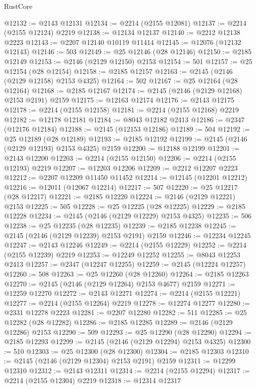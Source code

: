 \begin{lexlean}{RustCore}
\begin{coremodule}
@12132 := @2143 @12131
@12134 := @2214 (@2155 @12081)
@12137 := @2214 (@2155 @12124) @2219
@12138 := @12134 @12137
@12140 := @2212 @12138 @2223
@12143 := @2207 @12140 @10119 @11414
@12145 := @12076 (@12132 @12143)
@12146 := 503
@12149 := @25 @12146 (@28 @12146)
@12150 := @2185 @12149
@12153 := @2146 (@2129 @12150) @2153
@12154 := 501
@12157 := @25 @12154 (@28 @12154)
@12158 := @2185 @12157
@12163 := @2145 (@2146 (@2129 @12158) @2153 @4325)
@12164 := 502
@12167 := @25 @12164 (@28 @12164)
@12168 := @2185 @12167
@12174 := @2145 (@2146 (@2129 @12168) @2153 @2191) @2159
@12175 := @12163 @12174
@12176 := @2143 @12175
@12178 := @2214 (@2155 @12158)
@12181 := @2214 (@2155 @12168) @2219
@12182 := @12178 @12181
@12184 := @8043 @12182 @2413
@12186 := @2347 (@12176 @12184)
@12188 := @2145 (@12153 @12186)
@12189 := 504
@12192 := @25 @12189 (@28 @12189)
@12193 := @2185 @12192
@12199 := @2145 (@2146 (@2129 @12193) @2153 @4325) @2159
@12200 := @12188 @12199
@12201 := @2143 @12200
@12203 := @2214 (@2155 @12150)
@12206 := @2214 (@2155 @12193) @2219
@12207 := @12203 @12206
@12209 := @2212 @12207 @2223
@12212 := @2207 @12209 @11450 @11452
@12214 := @12145 (@12201 @12212)
@12216 := @12011 (@12067 @12214)
@12217 := 507
@12220 := @25 @12217 (@28 @12217)
@12221 := @2185 @12220
@12224 := @2146 (@2129 @12221) @2153
@12225 := 505
@12228 := @25 @12225 (@28 @12225)
@12229 := @2185 @12228
@12234 := @2145 (@2146 (@2129 @12229) @2153 @4325)
@12235 := 506
@12238 := @25 @12235 (@28 @12235)
@12239 := @2185 @12238
@12245 := @2145 (@2146 (@2129 @12239) @2153 @2191) @2159
@12246 := @12234 @12245
@12247 := @2143 @12246
@12249 := @2214 (@2155 @12229)
@12252 := @2214 (@2155 @12239) @2219
@12253 := @12249 @12252
@12255 := @8043 @12253 @2413
@12257 := @2347 (@12247 @12255)
@12259 := @2145 (@12224 @12257)
@12260 := 508
@12263 := @25 @12260 (@28 @12260)
@12264 := @2185 @12263
@12270 := @2145 (@2146 (@2129 @12264) @2153 @4677) @2159
@12271 := @12259 @12270
@12272 := @2143 @12271
@12274 := @2214 (@2155 @12221)
@12277 := @2214 (@2155 @12264) @2219
@12278 := @12274 @12277
@12280 := @2331 @12278 @2223
@12281 := @2207 @12280
@12282 := 511
@12285 := @25 @12282 (@28 @12282)
@12286 := @2185 @12285
@12289 := @2146 (@2129 @12286) @2153
@12290 := 509
@12293 := @25 @12290 (@28 @12290)
@12294 := @2185 @12293
@12299 := @2145 (@2146 (@2129 @12294) @2153 @4325)
@12300 := 510
@12303 := @25 @12300 (@28 @12300)
@12304 := @2185 @12303
@12310 := @2145 (@2146 (@2129 @12304) @2153 @2191) @2159
@12311 := @12299 @12310
@12312 := @2143 @12311
@12314 := @2214 (@2155 @12294)
@12317 := @2214 (@2155 @12304) @2219
@12318 := @12314 @12317

\end{coremodule}
\end{lexlean}
